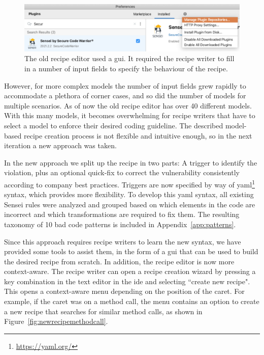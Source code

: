 \begin{figure}
  \centering
  \includegraphics[width=\textwidth,page=7]{04-tools/figures/figures2.pdf}
  \caption[Old model-based recipe editor]{The old recipe editor used a \gls{gui}. It required the recipe writer to fill in a number of input fields to specify the behaviour of the recipe.}
  \label{fig:recipeedit2} 
\end{figure}

However, for more complex models the number of input fields grew rapidly to accommodate a plethora of corner cases, and so did the number of models for multiple scenarios.
As of now the old recipe editor has over 40 different models.
With this many models, it becomes overwhelming for recipe writers that have to select a model to enforce their desired coding guideline.
The described model-based recipe creation process is not flexible and intuitive enough, so in the next iteration a new approach was taken.

In the new approach we split up the recipe in two parts: A trigger to identify the violation, plus an optional quick-fix to correct the vulnerability consistently according to company best practices.
Triggers are now specified by way of \gls{yaml}\footnote{\url{https://yaml.org/}} syntax, which provides more flexibility.
To develop this \gls{yaml} syntax, all existing Sensei rules were analyzed and grouped based on which elements in the code are incorrect and which transformations are required to fix them.
The resulting taxonomy of 10 bad code patterns is included in Appendix~\ref{app:patterns}.

Since this approach requires recipe writers to learn the new syntax, we have provided some tools to assist them, in the form of a \gls{gui} that can be used to build the desired recipe from scratch.
In addition, the recipe editor is now more context-aware.
The recipe writer can open a recipe creation wizard by pressing a key combination in the text editor in the \gls{ide} and selecting ``create new recipe".
This opens a context-aware menu depending on the position of the caret.
For example, if the caret was on a method call, the menu contains an option to create a new recipe that searches for similar method calls, as shown in Figure~\ref{fig:newrecipemethodcall}.

